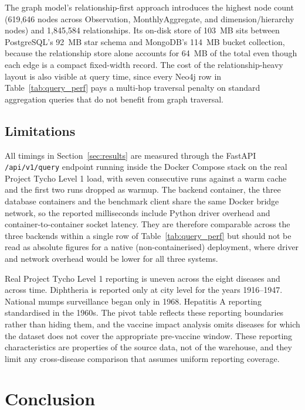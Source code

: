 \documentclass[12pt,a4paper]{article}
\begin{document}
The graph model's relationship-first approach introduces the highest node count (619{,}646 nodes across Observation, MonthlyAggregate, and dimension/hierarchy nodes) and 1{,}845{,}584 relationships. Its on-disk store of 103~MB sits between PostgreSQL's 92~MB star schema and MongoDB's 114~MB bucket collection, because the relationship store alone accounts for 64~MB of the total even though each edge is a compact fixed-width record. The cost of the relationship-heavy layout is also visible at query time, since every Neo4j row in Table~\ref{tab:query_perf} pays a multi-hop traversal penalty on standard aggregation queries that do not benefit from graph traversal.

\subsection{Limitations}

All timings in Section~\ref{sec:results} are measured through the FastAPI \texttt{/api/v1/query} endpoint running inside the Docker Compose stack on the real Project Tycho Level 1 load, with seven consecutive runs against a warm cache and the first two runs dropped as warmup. The backend container, the three database containers and the benchmark client share the same Docker bridge network, so the reported milliseconds include Python driver overhead and container-to-container socket latency. They are therefore comparable across the three backends within a single row of Table~\ref{tab:query_perf} but should not be read as absolute figures for a native (non-containerised) deployment, where driver and network overhead would be lower for all three systems.

Real Project Tycho Level 1 reporting is uneven across the eight diseases and across time. Diphtheria is reported only at city level for the years 1916--1947. National mumps surveillance began only in 1968. Hepatitis A reporting standardised in the 1960s. The pivot table reflects these reporting boundaries rather than hiding them, and the vaccine impact analysis omits diseases for which the dataset does not cover the appropriate pre-vaccine window. These reporting characteristics are properties of the source data, not of the warehouse, and they limit any cross-disease comparison that assumes uniform reporting coverage.


\section{Conclusion}
\label{sec:conclusion}
\end{document}
